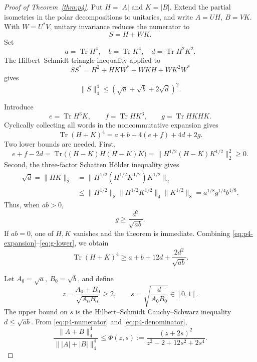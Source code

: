 \documentclass[10pt,a4paper]{amsart}
\newcommand{\Tr}{\operatorname{Tr}}
\begin{document}
\begin{proof}[Proof of Theorem~\ref{thm:p4}]
Put \(H=|A|\) and \(K=|B|\).  Extend the partial isometries in the polar
decompositions to unitaries, and write \(A=UH,\ B=VK\).
With \(W=U^*V\), unitary invariance reduces the numerator to
\[
 S=H+WK.
\]
Set
\[
 a=\Tr H^4,\quad b=\Tr K^4,\quad d=\Tr H^2K^2.
\]
The Hilbert--Schmidt triangle inequality applied to
\[
 SS^*=H^2+HKW^*+WKH+WK^2W^*
\]
gives
\begin{equation}\label{eq:p4-numerator}
 \|S\|_4^4
 \le(\sqrt a+\sqrt b+2\sqrt d)^2.
\end{equation}

Introduce
\[
 e=\Tr H^3K,\qquad f=\Tr HK^3,\qquad g=\Tr HKHK.
\]
Cyclically collecting all words in the noncommutative expansion gives
\begin{equation}\label{eq:p4-expansion}
 \Tr(H+K)^4=a+b+4(e+f)+4d+2g.
\end{equation}
Two lower bounds are needed.  First,
\begin{equation}\label{eq:p4-positive}
 e+f-2d
 =
 \Tr\big((H-K)H(H-K)K\big)
 =
 \|H^{1/2}(H-K)K^{1/2}\|_2^2
 \ge0.
\end{equation}
Second, the three-factor Schatten H\"older inequality gives
\begin{align*}
 \sqrt d=\|HK\|_2
 &=
 \|H^{1/2}(H^{1/2}K^{1/2})K^{1/2}\|_2\\
 &\le
 \|H^{1/2}\|_8
 \|H^{1/2}K^{1/2}\|_4
 \|K^{1/2}\|_8
 =
 a^{1/8}g^{1/4}b^{1/8}.
\end{align*}
Thus, when \(ab>0\),
\begin{equation}\label{eq:g-lower}
 g\ge\frac{d^2}{\sqrt{ab}}.
\end{equation}
If \(ab=0\), one of \(H,K\) vanishes and the theorem is immediate.
Combining \eqref{eq:p4-expansion}--\eqref{eq:g-lower}, we obtain
\begin{equation}\label{eq:p4-denominator}
 \Tr(H+K)^4
 \ge a+b+12d+\frac{2d^2}{\sqrt{ab}}.
\end{equation}

Let \(A_0=\sqrt a,\ B_0=\sqrt b\), and define
\[
 z=\frac{A_0+B_0}{\sqrt{A_0B_0}}\ge2,\qquad
 s=\sqrt{\frac{d}{A_0B_0}}\in[0,1].
\]
The upper bound on \(s\) is the Hilbert--Schmidt Cauchy--Schwarz
inequality \(d\le\sqrt{ab}\).  From
\eqref{eq:p4-numerator} and \eqref{eq:p4-denominator},
\begin{equation}\label{eq:Phi}
 \frac{\|A+B\|_4^4}{\||A|+|B|\|_4^4}
 \le
 \Phi(z,s)
 :=
 \frac{(z+2s)^2}{z^2-2+12s^2+2s^4}.
\end{equation}


\end{proof}
\end{document}
